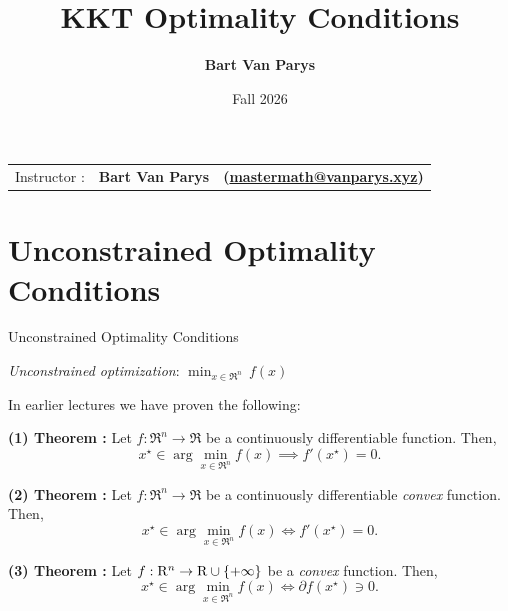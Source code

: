 \documentclass[9pt]{beamer}
\title[Continuous Optimization]{KKT Optimality Conditions}
\author[]{\textbf{Bart Van Parys}}
\date[]{Fall 2026}
\begin{document}
\begin{frame}  

  \maketitle

  \vspace{-2em}
  
    \begin{center}
    \begin{tabular}{lll}
      Instructor : & \textbf{Bart Van Parys} & \textbf{(\href{mailto:mastermath@vanparys.xyz}{mastermath@vanparys.xyz})} \\
    \end{tabular}
  \end{center}
  
\end{frame}

\section{Unconstrained Optimality Conditions}

\begin{frame}{Unconstrained Optimality Conditions}

  \emph{Unconstrained optimization}: \quad
  \(
    \min_{x\in\Re^n} \,f(x)
  \)

  \vfill
  
  In earlier lectures we have proven the following:
  
  \vfill
  
  \textbf{(1) Theorem : } Let $f:\Re^n\to\Re$ be a continuously differentiable function. Then,
  \[
    x^\star \in \arg\min_{x\in \Re^n} f(x) \implies  f'(x^\star) =0.
  \]

  \vfill

  \textbf{(2) Theorem : } Let $f:\Re^n\to\Re$ be a continuously differentiable \emph{convex} function. Then,
  \[
    x^\star \in \arg\min_{x\in \Re^n} f(x) \iff  f'(x^\star) =0.
  \]

  \vfill

  \textbf{(3) Theorem : } Let $f:\mathrm{R}^n\to\mathrm{R}\cup\{+\infty\}$ be a \emph{convex} function. Then,
  \[
    x^\star \in \arg\min_{x\in \Re^n} f(x) \iff  \partial f(x^\star) \ni 0.
  \]

\end{frame}
\end{document}
